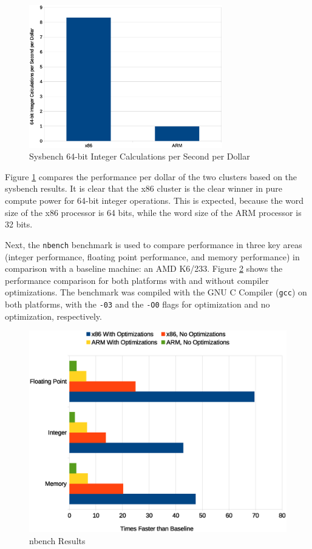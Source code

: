 \documentclass[11pt]{book}
\begin{document}
\begin{figure}
\centering
\includegraphics[width=0.75\textwidth]{sysbench_cost}
\caption{Sysbench 64-bit Integer Calculations per Second per Dollar}
\label{sysbench-cost}
\end{figure}

Figure \ref{sysbench-cost} compares the performance per dollar of the two clusters based
on the sysbench results.  It is clear that the x86 cluster is the clear winner in pure
compute power for 64-bit integer operations.  This is expected, because the word size of
the x86 processor is 64 bits, while the word size of the ARM processor is 32 bits.

Next, the \verb;nbench; benchmark \cite{nbench} is used to compare performance in three
key areas (integer performance, floating point performance, and memory performance) in
comparison with a baseline machine: an AMD K6/233.  Figure \ref{nbench-all} shows the
performance comparison for both platforms with and without compiler optimizations.  The
benchmark was compiled with the GNU C Compiler (\verb;gcc;) on both platforms, with the
\verb;-03; and the \verb;-O0; flags for optimization and no optimization, respectively.

\begin{figure}
\centering
\includegraphics[width=\textwidth]{nbench_all}
\caption{nbench Results}
\label{nbench-all}
\end{figure}
\end{document}
